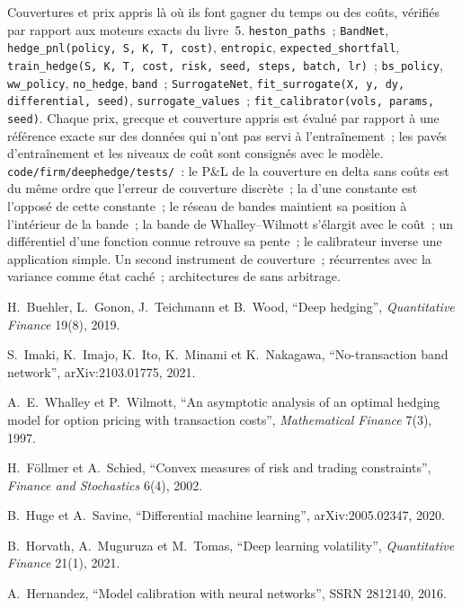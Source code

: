 \begin{build}
 Couvertures et prix appris là où ils font gagner du temps ou des coûts, vérifiés par rapport aux moteurs exacts du livre~5.
 \texttt{heston\_paths}~; \texttt{BandNet}, \texttt{hedge\_pnl(policy, S, K, T, cost)}, \texttt{entropic},
\texttt{expected\_shortfall}, \texttt{train\_hedge(S, K, T, cost, risk, seed, steps, batch, lr)}~; \texttt{bs\_policy},
\texttt{ww\_policy}, \texttt{no\_hedge}, \texttt{band}~; \texttt{SurrogateNet},
\texttt{fit\_surrogate(X, y, dy, differential, seed)}, \texttt{surrogate\_values}~; \texttt{fit\_calibrator(vols, params, seed)}.
 Chaque prix, grecque et couverture appris est évalué par rapport à une référence exacte sur des données qui n'ont pas servi à l'entraînement~;
les pavés d'entraînement et les niveaux de coût sont consignés avec le modèle.
 \texttt{code/firm/deephedge/tests/}~: le P\&L de la couverture en delta sans coûts est du même ordre que l'erreur
de couverture discrète~; la  d'une constante est l'opposé de cette constante~; le réseau de bandes maintient sa position à l'intérieur de la
bande~; la bande de Whalley--Wilmott s'élargit avec le coût~; un  différentiel d'une fonction connue retrouve sa pente~; le
calibrateur inverse une application simple.
 Un second instrument de couverture~;  récurrentes avec la variance comme état caché~; architectures de
 sans arbitrage.
\end{build}

\begin{omsources}
\item H.~Buehler, L.~Gonon, J.~Teichmann et B.~Wood, ``Deep hedging'', \emph{Quantitative Finance} 19(8), 2019.
\item S.~Imaki, K.~Imajo, K.~Ito, K.~Minami et K.~Nakagawa, ``No-transaction band network'', arXiv:2103.01775, 2021.
\item A.~E.~Whalley et P.~Wilmott, ``An asymptotic analysis of an optimal hedging model for option pricing with transaction
costs'', \emph{Mathematical Finance} 7(3), 1997.
\item H.~Föllmer et A.~Schied, ``Convex measures of risk and trading constraints'', \emph{Finance and Stochastics} 6(4), 2002.
\item B.~Huge et A.~Savine, ``Differential machine learning'', arXiv:2005.02347, 2020.
\item B.~Horvath, A.~Muguruza et M.~Tomas, ``Deep learning volatility'', \emph{Quantitative Finance} 21(1), 2021.
\item A.~Hernandez, ``Model calibration with neural networks'', SSRN 2812140, 2016.
\end{omsources}

